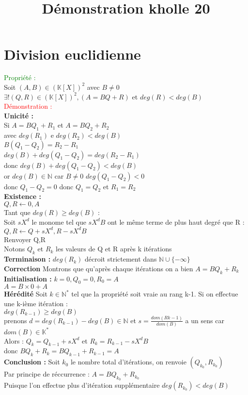 \documentclass{article}
\begin{document}
\title{Démonstration kholle 20}
\date{}
\maketitle
	\renewcommand{\thesection}{\Roman{section}}
	\setlength{\parindent}{1.5cm}
\section{Division euclidienne}
\textcolor{green}{Propriété : } \\ 
Soit $(A,B) \in (\mathbb K [X])^2$ avec $B \neq 0$ \\ 
$\exists ! (Q,R) \in (\mathbb K [X])^2, (A=BQ+R)$ et $deg(R) < deg(B)$ \\ 
\textcolor{red}{Démonstration :} \\ 
{\bf Unicité :} \\ 
Si $A = BQ_1+R_1$ et $A=BQ_2 +R_2$ \\ 
avec $deg(R_1)$ e $deg(R_2)< deg (B)$ \\
$B(Q_1-Q_2)=R_2-R_1$ \\ 
$deg(B) +deg(Q_1-Q_2)=deg(R_2-R_1) $ \\ 
donc $deg(B)+deg(Q_1-Q_2)<deg(B)$ \\
or $deg(B) \in \mathbb N$ car $B  \neq 0$ $deg(Q_1-Q_2)<0$ \\ 
donc $Q_1-Q_2=0$ donc $Q_1=Q_2$ et $R_1=R_2$ \\ 
{\bf Existence :} \\ 
$Q,R \leftarrow 0,A$ \\ 
Tant que $deg(R) \geq deg(B)$ : \\ 
\indent Soit $sX^d$ le monome tel que $sX^dB$ ont le même terme de plus haut degré que R : \\
\indent $Q,R \leftarrow Q+sX^d,R-sX^dB$ \\ 
Renvoyer Q,R \\ 
Notons $Q_k$ et $R_k$ les valeurs de Q et R après k itérations \\
{\bf Terminaison :} $deg(R_k)$ décroit strictement dans $\mathbb N \cup \lbrace - \infty \rbrace$ \\ 
{\bf Correction} Montrons que qu'après chaque itérations on a bien $A=BQ_k+R_k$ \\ 
{\bf Initialisation :} $k=0, Q_0=0, R_0=A$ \\ 
$A=B \times 0 +A$ \\ 
{\bf Hérédité} Soit $ k \in \mathbb N^*$ tel que la propriété soit vraie au rang k-1. Si on effectue une k-ième itération : \\ 
$deg(R_{k-1}) \geq deg(B)$ \\ 
prenons $d=deg(R_{k-1}) -deg(B) \in \mathbb N$ et $s= \frac{dom(R{k-1})}{dom(B)}$ a un sens car $dom(B) \in \mathbb K ^*$ \\ 
Alors : $Q_k =Q_{k-1} + s X^d$ et $R_k=R_{k-1} -s X^dB$ \\ 
donc $B Q_k +R_k =B Q_{k-1} +R_{k-1} =A$ \\ 
{\bf Conclusion :} Soit $k_0$ le nombre total d'itérations, on renvoie $(Q_{k_0},R_{k_0})$ \\ 
Par principe de réccurrence : $A=BQ_{k_0} + R_{k_0}$ \\ 
Puisque l'on effectue plus d'itération supplémentaire $deg(R_{k_0}) < deg(B)$
\end{document}
